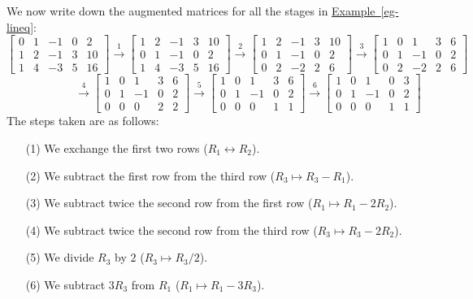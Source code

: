 \documentclass[a4paper]{book}
\newcommand{\xra}       {\xrightarrow}
\renewcommand{\:}{\colon}
\newcommand{\biref}[2]{\hyperlink{#2}{#1~\ref*{#2}}}
\theoremstyle{definition}
\begin{document}
We now write down the augmented matrices for all the stages in
\biref{Example}{eg-lineq}:
{\tiny \[
 \left[\begin{array}{cccc|c}
   0 &  1 & -1 &  0 &  2 \\ 
   1 &  2 & -1 &  3 & 10 \\
   1 &  4 & -3 &  5 & 16
 \end{array}\right]
 \xra{1}
 \left[\begin{array}{cccc|c}
   1 &  2 & -1 &  3 & 10 \\
   0 &  1 & -1 &  0 &  2 \\ 
   1 &  4 & -3 &  5 & 16
 \end{array}\right]
 \xra{2}
 \left[\begin{array}{cccc|c}
   1 &  2 & -1 &  3 & 10 \\
   0 &  1 & -1 &  0 &  2 \\ 
   0 &  2 & -2 &  2 &  6
 \end{array}\right]
 \xra{3}
 \left[\begin{array}{cccc|c}
   1 &  0 &  1 &  3 &  6 \\
   0 &  1 & -1 &  0 &  2 \\ 
   0 &  2 & -2 &  2 &  6
 \end{array}\right]
\]
\[ \hspace{6em}
 \xra{4}
 \left[\begin{array}{cccc|c}
   1 &  0 &  1 &  3 &  6 \\
   0 &  1 & -1 &  0 &  2 \\ 
   0 &  0 &  0 &  2 &  2
 \end{array}\right]
 \xra{5}
 \left[\begin{array}{cccc|c}
   1 &  0 &  1 &  3 &  6 \\
   0 &  1 & -1 &  0 &  2 \\ 
   0 &  0 &  0 &  1 &  1
 \end{array}\right]
 \xra{6}
 \left[\begin{array}{cccc|c}
   1 &  0 &  1 &  0 &  3 \\
   0 &  1 & -1 &  0 &  2 \\ 
   0 &  0 &  0 &  1 &  1
 \end{array}\right]
\]}
The steps taken are as follows:
\begin{itemize}
 \item[(1)] We exchange the first two rows
  ($R_1\leftrightarrow R_2$).  
 \item[(2)] We subtract the first row from the third row
  ($R_3\mapsto R_3-R_1$).
 \item[(3)] We subtract twice the second row from the first row 
  ($R_1\mapsto R_1-2R_2$).
 \item[(4)] We subtract twice the second row from the third row 
  ($R_3\mapsto R_3-2R_2$).
 \item[(5)] We divide $R_3$ by $2$ ($R_3\mapsto R_3/2$).
 \item[(6)] We subtract $3R_3$ from $R_1$ ($R_1\mapsto R_1-3R_3$).
\end{itemize}
\end{document}
